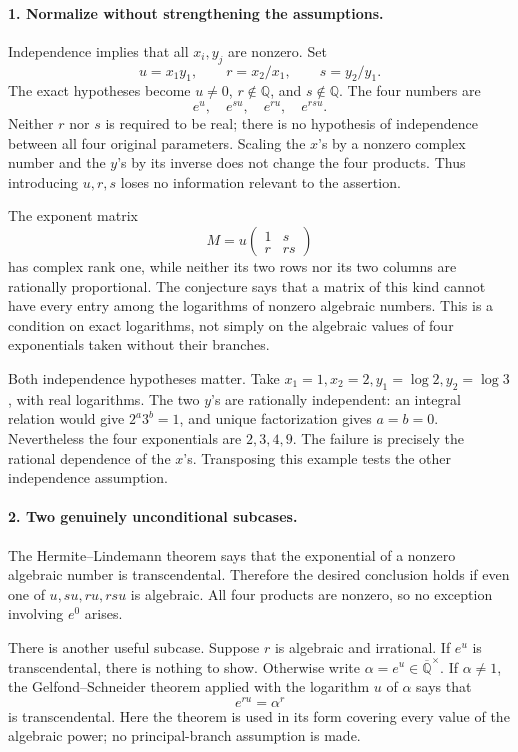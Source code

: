 \documentclass[11pt]{article}
\begin{document}
\paragraph{1. Normalize without strengthening the assumptions.}
Independence implies that all $x_i,y_j$ are nonzero. Set
\[
 u=x_1y_1,\qquad r=x_2/x_1,\qquad s=y_2/y_1.
\]
The exact hypotheses become $u\ne0$, $r\notin\mathbb Q$, and $s\notin\mathbb Q$. The four numbers are
\[
 e^u,\quad e^{su},\quad e^{ru},\quad e^{rsu}.
\]
Neither $r$ nor $s$ is required to be real; there is no hypothesis of independence between all four original parameters. Scaling the $x$'s by a nonzero complex number and the $y$'s by its inverse does not change the four products. Thus introducing $u,r,s$ loses no information relevant to the assertion.

The exponent matrix
\[
 M=u\begin{pmatrix}1&s\\r&rs\end{pmatrix}
\]
has complex rank one, while neither its two rows nor its two columns are rationally proportional. The conjecture says that a matrix of this kind cannot have every entry among the logarithms of nonzero algebraic numbers. This is a condition on exact logarithms, not simply on the algebraic values of four exponentials taken without their branches.

Both independence hypotheses matter. Take $x_1=1,x_2=2,y_1=\log2,y_2=\log3$, with real logarithms. The two $y$'s are rationally independent: an integral relation would give $2^a3^b=1$, and unique factorization gives $a=b=0$. Nevertheless the four exponentials are $2,3,4,9$. The failure is precisely the rational dependence of the $x$'s. Transposing this example tests the other independence assumption.

\paragraph{2. Two genuinely unconditional subcases.}
The Hermite--Lindemann theorem says that the exponential of a nonzero algebraic number is transcendental. Therefore the desired conclusion holds if even one of $u,su,ru,rsu$ is algebraic. All four products are nonzero, so no exception involving $e^0$ arises.

There is another useful subcase. Suppose $r$ is algebraic and irrational. If $e^u$ is transcendental, there is nothing to show. Otherwise write $\alpha=e^u\in\overline{\mathbb Q}^{\times}$. If $\alpha\ne1$, the Gelfond--Schneider theorem applied with the logarithm $u$ of $\alpha$ says that
\[
 e^{ru}=\alpha^r
\]
is transcendental. Here the theorem is used in its form covering every value of the algebraic power; no principal-branch assumption is made.
\end{document}
